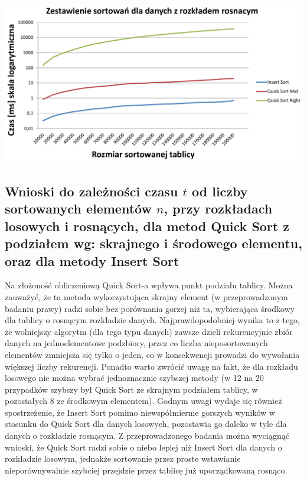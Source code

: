 \documentclass[polish,polish,a4paper]{article}
\begin{document}
\begin{spacing}{1.5}
\begin{minipage}[H]{\textwidth}
	\begin{center}
		\includegraphics[scale=0.6]{zad3rosnacylog.pdf}
		\label{fig:zad3roslog}
	\end{center}
\end{minipage}


\subsection{Wnioski do zależności czasu $t$ od liczby sortowanych elementów $n$, przy rozkładach losowych i rosnących, dla metod Quick Sort z podziałem wg: skrajnego i środowego elementu, oraz dla metody Insert Sort}

Na złożoność obliczeniową Quick Sort-a wpływa punkt podziału tablicy. Można zauważyć, że ta metoda wykorzystująca skrajny element (w przeprowadzonym badaniu prawy) radzi sobie bez porównania gorzej niż ta, wybierająca środkowy dla tablicy o rosnącym rozkładzie danych. Najprawdopodobniej wynika to z tego, że wolniejszy algorytm (dla tego typu danych) zawsze dzieli rekurencyjnie zbiór danych na jednoelementowe podzbiory, przez co liczba nieposortowanych elementów zmniejsza się tylko o jeden, co w konsekwencji prowadzi do wywołania większej liczby rekurencji. Ponadto warto zwrócić uwagę na fakt, że dla rozkładu losowego nie można wybrać jednoznacznie szybszej metody (w 12 na 20 przypadków szybszy był Quick Sort ze skrajnym podziałem tablicy, w pozostałych 8 ze środkowym elementem). Godnym uwagi wydaje się również spostrzeżenie, że Insert Sort pomimo niewspółmiernie gorszych wyników w stosunku do Quick Sort dla danych losowych, pozostawia go daleko w tyle dla danych o rozkładzie rosnącym. Z przeprowadzonego badania można wyciągnąć wnioski, że Quick Sort radzi sobie o niebo lepiej niż Insert Sort dla danych o rozkładzie losowym, jednakże sortowanie przez proste wstawianie nieporównywalnie szybciej przejdzie przez tablicę już uporządkowaną rosnąco.


\end{spacing}
\end{document}
